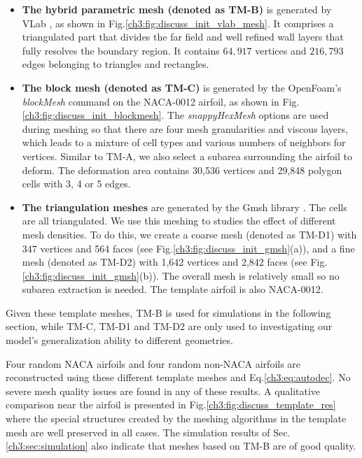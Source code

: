\begin{itemize}
    \item {\textbf{The hybrid parametric mesh (denoted as TM-B)} is generated by VLab \cite{aa.Chappin2010, aa.Viola2018}, as shown in Fig.\ref{ch3:fig:discuss_init_vlab_mesh}. It comprises a triangulated part that divides the far field and well refined wall layers that fully resolves the boundary region. It contains $64,917$ vertices and $216,793$ edges belonging to triangles and rectangles.}

    \item \textbf{The block mesh (denoted as TM-C)} is generated by the OpenFoam's \textit{blockMesh} command on the NACA-0012 airfoil, as shown in Fig.\ref{ch3:fig:discuss_init_blockmesh}.
    The \textit{snappyHexMesh} options are used during meshing so that there are four mesh granularities and viscous layers, which leads to a mixture of cell types and various numbers of neighbors for vertices.
    Similar to TM-A, we also select a subarea surrounding the airfoil to deform.
    The deformation area contains 30,536 vertices and 29,848 polygon cells with 3, 4 or 5 edges.
    
    \item \textbf{The triangulation meshes} are generated by the Gmsh library \cite{aa.Geuzaine2009}.
    The cells are all triangulated.
    We use this meshing to studies the effect of different mesh densities.
    To do this, we create a coarse mesh (denoted as TM-D1) with 347 vertices and 564 faces (see Fig.\ref{ch3:fig:discuss_init_gmsh}(a)), and a fine mesh (denoted as TM-D2) with 1,642 vertices and 2,842 faces (see Fig.\ref{ch3:fig:discuss_init_gmsh}(b)).
    The overall mesh is relatively small so no subarea extraction is needed.
    The template airfoil is also NACA-0012.
\end{itemize}
%
Given these template meshes, TM-B is used for simulations in the following section, while TM-C, TM-D1 and TM-D2 are only used to investigating our model's generalization ability to different geometries.

Four random NACA airfoils and four random non-NACA airfoils are reconstructed using these different template meshes and Eq.\ref{ch3:eq:autodec}. No severe mesh quality issues are found in any of these results. 
A qualitative comparison near the airfoil is presented in Fig.\ref{ch3:fig:discuss_template_res} where the special structures created by the meshing algorithms in the template mesh are well preserved in all cases. The simulation results of Sec.\ref{ch3:sec:simulation} also indicate that meshes based on TM-B are of good quality.